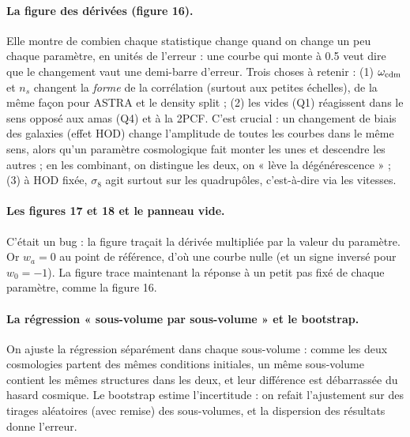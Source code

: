 \paragraph{La figure des dérivées (figure 16).} Elle montre de combien chaque statistique change quand on change un peu chaque paramètre, en unités de l'erreur : une courbe qui monte à 0.5 veut dire que le changement vaut une demi-barre d'erreur. Trois choses à retenir : (1) $\omega_{\rm cdm}$ et $n_s$ changent la \emph{forme} de la corrélation (surtout aux petites échelles), de la même façon pour ASTRA et le density split ; (2) les vides (Q1) réagissent dans le sens opposé aux amas (Q4) et à la 2PCF. C'est crucial : un changement de biais des galaxies (effet HOD) change l'amplitude de toutes les courbes dans le même sens, alors qu'un paramètre cosmologique fait monter les unes et descendre les autres ; en les combinant, on distingue les deux, on « lève la dégénérescence » ; (3) à HOD fixée, $\sigma_8$ agit surtout sur les quadrupôles, c'est-à-dire via les vitesses.

\paragraph{Les figures 17 et 18 et le panneau vide.} C'était un bug : la figure traçait la dérivée multipliée par la valeur du paramètre. Or $w_a=0$ au point de référence, d'où une courbe nulle (et un signe inversé pour $w_0=-1$). La figure trace maintenant la réponse à un petit pas fixé de chaque paramètre, comme la figure 16.

\paragraph{La régression « sous-volume par sous-volume » et le bootstrap.} On ajuste la régression séparément dans chaque sous-volume : comme les deux cosmologies partent des mêmes conditions initiales, un même sous-volume contient les mêmes structures dans les deux, et leur différence est débarrassée du hasard cosmique. Le bootstrap estime l'incertitude : on refait l'ajustement sur des tirages aléatoires (avec remise) des sous-volumes, et la dispersion des résultats donne l'erreur.

